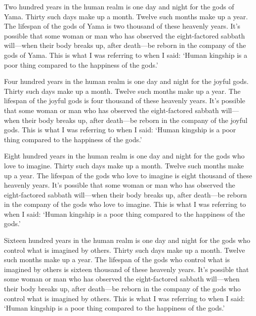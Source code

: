 \documentclass[12pt,openany]{book}%
\begin{document}
Two hundred years in the human realm is one day and night for the gods of Yama. Thirty such days make up a month. Twelve such months make up a year. The lifespan of the gods of Yama is two thousand of these heavenly years. It’s possible that some woman or man who has observed the eight-factored sabbath will—when their body breaks up, after death—be reborn in the company of the gods of Yama. This is what I was referring to when I said: ‘Human kingship is a poor thing compared to the happiness of the gods.’ 

Four hundred years in the human realm is one day and night for the joyful gods. Thirty such days make up a month. Twelve such months make up a year. The lifespan of the joyful gods is four thousand of these heavenly years. It’s possible that some woman or man who has observed the eight-factored sabbath will—when their body breaks up, after death—be reborn in the company of the joyful gods. This is what I was referring to when I said: ‘Human kingship is a poor thing compared to the happiness of the gods.’ 

Eight hundred years in the human realm is one day and night for the gods who love to imagine. Thirty such days make up a month. Twelve such months make up a year. The lifespan of the gods who love to imagine is eight thousand of these heavenly years. It’s possible that some woman or man who has observed the eight-factored sabbath will—when their body breaks up, after death—be reborn in the company of the gods who love to imagine. This is what I was referring to when I said: ‘Human kingship is a poor thing compared to the happiness of the gods.’ 

Sixteen hundred years in the human realm is one day and night for the gods who control what is imagined by others. Thirty such days make up a month. Twelve such months make up a year. The lifespan of the gods who control what is imagined by others is sixteen thousand of these heavenly years. It’s possible that some woman or man who has observed the eight-factored sabbath will—when their body breaks up, after death—be reborn in the company of the gods who control what is imagined by others. This is what I was referring to when I said: ‘Human kingship is a poor thing compared to the happiness of the gods.’ 
\end{document}
